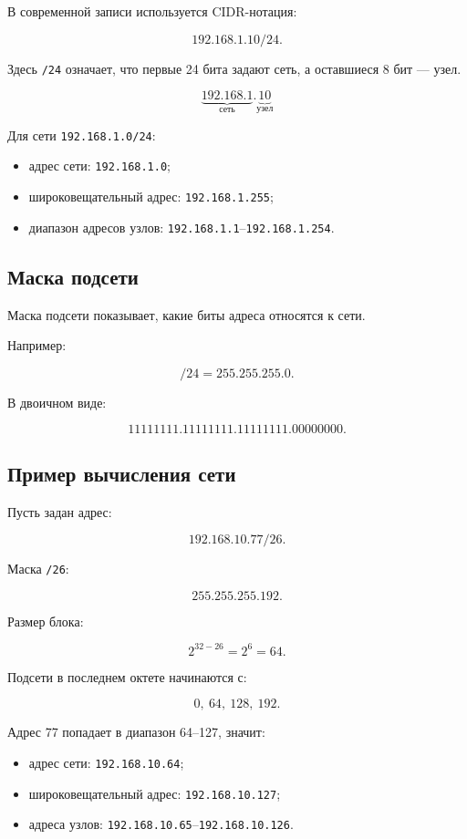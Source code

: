 \documentclass[12pt,a4paper]{article}
\begin{document}
В современной записи используется CIDR-нотация:

\[
192.168.1.10/24.
\]

Здесь \texttt{/24} означает, что первые 24 бита задают сеть, а оставшиеся 8 бит --- узел.

\[
\underbrace{192.168.1}_{\text{сеть}}.\underbrace{10}_{\text{узел}}
\]

Для сети \texttt{192.168.1.0/24}:

\begin{itemize}
    \item адрес сети: \texttt{192.168.1.0};
    \item широковещательный адрес: \texttt{192.168.1.255};
    \item диапазон адресов узлов: \texttt{192.168.1.1}--\texttt{192.168.1.254}.
\end{itemize}

\subsection{Маска подсети}

Маска подсети показывает, какие биты адреса относятся к сети.

Например:

\[
/24 = 255.255.255.0.
\]

В двоичном виде:

\[
11111111.11111111.11111111.00000000.
\]

\subsection{Пример вычисления сети}

Пусть задан адрес:

\[
192.168.10.77/26.
\]

Маска \texttt{/26}:

\[
255.255.255.192.
\]

Размер блока:

\[
2^{32-26} = 2^6 = 64.
\]

Подсети в последнем октете начинаются с:

\[
0,\ 64,\ 128,\ 192.
\]

Адрес 77 попадает в диапазон 64--127, значит:

\begin{itemize}
    \item адрес сети: \texttt{192.168.10.64};
    \item широковещательный адрес: \texttt{192.168.10.127};
    \item адреса узлов: \texttt{192.168.10.65}--\texttt{192.168.10.126}.
\end{itemize}
\end{document}
